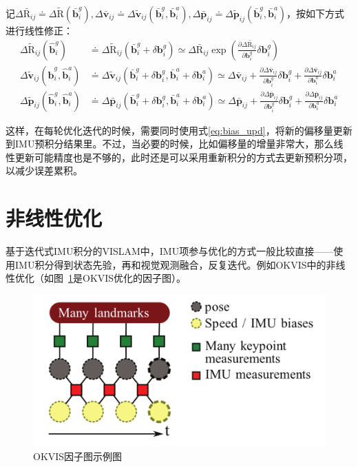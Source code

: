 记$\Delta\bar{\mathrm R}_{ij}\doteq\Delta\tilde{\mathrm R}(\bar{\bm b}^g_i), \Delta\bar{\bm v}_{ij}\doteq\Delta\tilde{\bm v}_{ij}(\bar{\bm b}^g_i,\bar{\bm b}^a_i), \Delta\bar{\bm p}_{ij}\doteq\Delta\tilde{\bm p}_{ij}(\bar{\bm b}^g_i,\bar{\bm b}^a_i)$，按如下方式进行线性修正：
\begin{equation}
\begin{aligned}
    \Delta\tilde{\mathrm R}_{ij}(\hat{\bm b}_i^g)
    &\doteq \Delta\tilde{\mathrm R}_{ij}(\bar{\bm b}^g_i + \delta\bm{b}^g_i)
    \simeq \Delta\bar{\mathrm R}_{ij}
    \exp\left(
      \tfrac{\partial\Delta\bar{\mathrm R}_{ij}}{\partial\bm{b}^g_i}
      \delta\bm{b}^g_i
    \right) \\
    \Delta\tilde{\bm v}_{ij}(\hat{\bm b}^g_i,\hat{\bm b}^a_i)
    &\doteq \Delta\tilde{\bm v}_{ij}(
    \bar{\bm b}^g_i + \delta\bm{b}^g_i,
    \bar{\bm b}^a_i + \delta\bm{b}^a_i)
    \simeq \Delta\bar{\bm v}_{ij} +
    \tfrac{\partial\Delta\bar{\bm v}_{ij}}{\partial\bm{b}^g_i}
    \delta\bm{b}^g_i +
    \tfrac{\partial\Delta\bar{\bm v}_{ij}}{\partial\bm{b}^a_i}
    \delta\bm{b}^a_i \\
    \Delta\tilde{\bm p}_{ij}(\hat{\bm b}^g_i,\hat{\bm b}^a_i)
    &\doteq \Delta\bar{\bm p}_{ij}(
    \bar{\bm b}^g_i + \delta\bm{b}^g_i,
    \bar{\bm b}^a_i + \delta\bm{b}^a_i)
    \simeq \Delta\bar{\bm p}_{ij} +
    \tfrac{\partial\Delta\bar{\bm p}_{ij}}{\partial\bm{b}^g_i}
    \delta\bm{b}^g_i +
    \tfrac{\partial\Delta\bar{\bm p}_{ij}}{\partial\bm{b}^a_i}
    \delta\bm{b}^a_i
\end{aligned}
\label{eq:bias_upd}
\end{equation}

这样，在每轮优化迭代的时候，需要同时使用式\eqref{eq:bias_upd}，将新的偏移量更新到IMU预积分结果里。不过，当必要的时候，比如偏移量的增量非常大，那么线性更新可能精度也是不够的，此时还是可以采用重新积分的方式去更新预积分项，以减少误差累积。

\section{非线性优化}

基于迭代式IMU积分的VISLAM中，IMU项参与优化的方式一般比较直接——使用IMU积分得到状态先验，再和视觉观测融合，反复迭代。例如OKVIS中的非线性优化（如图~\ref{fig:okvis}是OKVIS优化的因子图）。

\begin{figure}[htb!]
    \centering
    \includegraphics[width=.5\textwidth]{Pictures/okvis.png}
    \caption{OKVIS因子图示例图\citep{leutenegger2015keyframe}}
    \label{fig:okvis}
\end{figure}


